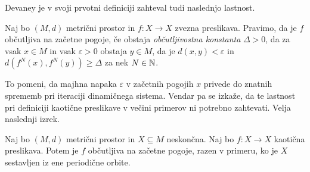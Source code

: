 Devaney je v svoji prvotni definiciji zahteval tudi naslednjo lastnost.

\begin{definicija}
    Naj bo \((M, d)\) metrični prostor in \(f \colon X \to X\) zvezna preslikava. Pravimo, da je \(f\) občutljiva na začetne pogoje, če obstaja \emph{občutljivostna konstanta} \(\Delta > 0\), da za vsak \(x \in M\) in vsak \(\varepsilon > 0\) obstaja \(y \in M\), da je \(d (x, y) < \varepsilon\) in \(d (f^N (x), f^N (y)) \geq \Delta\) za nek \(N \in \mathbb N\).
\end{definicija}

\noindent To pomeni, da majhna napaka \(\varepsilon\) v začetnih pogojih \(x\) privede do znatnih sprememb pri iteraciji dinamičnega sistema. Vendar pa se izkaže, da te lastnost pri definiciji kaotične preslikave v večini primerov ni potrebno zahtevati. Velja naslednji izrek.

\begin{izrek}
    Naj bo \((M, d)\) metrični prostor in \(X \subseteq M\) neskončna. Naj bo \(f \colon X \to X\) kaotična preslikava. Potem je \(f\) občutljiva na začetne pogoje, razen v primeru, ko je \(X\) sestavljen iz ene periodične orbite.
\end{izrek}

